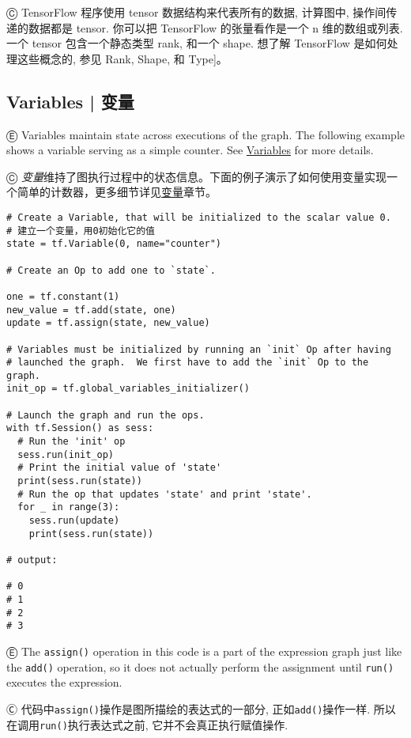 Ⓒ TensorFlow 程序使用 tensor 数据结构来代表所有的数据, 计算图中, 操作间传递的数据都是 tensor. 你可以把 TensorFlow 的张量看作是一个 n 维的数组或列表. 一个 tensor 包含一个静态类型 rank, 和一个 shape. 想了解 TensorFlow 是如何处理这些概念的, 参见 Rank, Shape, 和 Type]。


%
\subsection{Variables  |  变量}

Ⓔ \textcolor{etc}{Variables maintain state across executions of the graph. The following example shows a variable serving as a simple counter. See \hyperref[variables]{Variables} for more details.}

Ⓒ \emph{变量}维持了图执行过程中的状态信息。下面的例子演示了如何使用变量实现一个简单的计数器，更多细节详见\hyperref[variables]{变量}章节。

\begin{lstlisting}
# Create a Variable, that will be initialized to the scalar value 0.
# 建立一个变量，用0初始化它的值
state = tf.Variable(0, name="counter")

# Create an Op to add one to `state`.

one = tf.constant(1)
new_value = tf.add(state, one)
update = tf.assign(state, new_value)

# Variables must be initialized by running an `init` Op after having
# launched the graph.  We first have to add the `init` Op to the graph.
init_op = tf.global_variables_initializer()

# Launch the graph and run the ops.
with tf.Session() as sess:
  # Run the 'init' op
  sess.run(init_op)
  # Print the initial value of 'state'
  print(sess.run(state))
  # Run the op that updates 'state' and print 'state'.
  for _ in range(3):
    sess.run(update)
    print(sess.run(state))

# output:

# 0
# 1
# 2
# 3
\end{lstlisting}

Ⓔ \textcolor{etc}{The \lstinline{assign()} operation in this code is a part of the expression graph just like the \lstinline{add()} operation, so it does not actually perform the assignment until \lstinline{run()} executes the expression.}

Ⓒ 代码中\lstinline{assign()}操作是图所描绘的表达式的一部分, 正如\lstinline {add()}操作一样. 所以在调用\lstinline {run()}执行表达式之前, 它并不会真正执行赋值操作.


